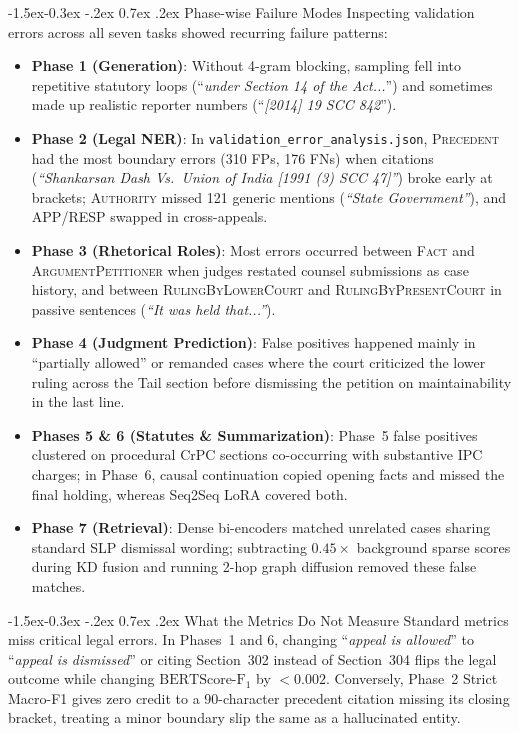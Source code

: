 \documentclass[11pt, oneside]{article}
\makeatletter
\renewcommand\subsection{\@startsection{subsection}{2}{\z@}%
  {-1.5ex\@plus -0.3ex \@minus -.2ex}%
  {0.7ex \@plus .2ex}%
  {\normalfont\large\bfseries}}
\makeatother
\begin{document}
\subsection{Phase-wise Failure Modes}
Inspecting validation errors across all seven tasks showed recurring failure patterns:
\begin{itemize}[leftmargin=*,nosep]
    \item \textbf{Phase 1 (Generation)}: Without 4-gram blocking, sampling fell into repetitive statutory loops (``\emph{under Section 14 of the Act...}'') and sometimes made up realistic reporter numbers (``\emph{[2014] 19 SCC 842}'').
    \item \textbf{Phase 2 (Legal NER)}: In \texttt{validation\_error\_analysis.json}, \textsc{Precedent} had the most boundary errors (310 FPs, 176 FNs) when citations (\emph{``Shankarsan Dash Vs.\ Union of India [1991 (3) SCC 47]''}) broke early at brackets; \textsc{Authority} missed 121 generic mentions (\emph{``State Government''}), and \textsc{APP}/\textsc{RESP} swapped in cross-appeals.
    \item \textbf{Phase 3 (Rhetorical Roles)}: Most errors occurred between \textsc{Fact} and \textsc{ArgumentPetitioner} when judges restated counsel submissions as case history, and between \textsc{RulingByLowerCourt} and \textsc{RulingByPresentCourt} in passive sentences (\emph{``It was held that...''}).
    \item \textbf{Phase 4 (Judgment Prediction)}: False positives happened mainly in ``partially allowed'' or remanded cases where the court criticized the lower ruling across the Tail section before dismissing the petition on maintainability in the last line.
    \item \textbf{Phases 5 \& 6 (Statutes \& Summarization)}: Phase~5 false positives clustered on procedural CrPC sections co-occurring with substantive IPC charges; in Phase~6, causal continuation copied opening facts and missed the final holding, whereas Seq2Seq LoRA covered both.
    \item \textbf{Phase 7 (Retrieval)}: Dense bi-encoders matched unrelated cases sharing standard SLP dismissal wording; subtracting $0.45\times$ background sparse scores during KD fusion and running 2-hop graph diffusion removed these false matches.
\end{itemize}

\subsection{What the Metrics Do Not Measure}
Standard metrics miss critical legal errors. In Phases~1 and 6, changing ``\emph{appeal is allowed}'' to ``\emph{appeal is dismissed}'' or citing Section~302 instead of Section~304 flips the legal outcome while changing $\text{BERTScore-F}_1$ by $<0.002$. Conversely, Phase~2 Strict Macro-F1 gives zero credit to a 90-character precedent citation missing its closing bracket, treating a minor boundary slip the same as a hallucinated entity.
\end{document}

